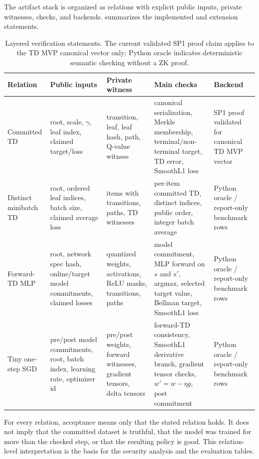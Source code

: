 The artifact stack is organized as relations with explicit public inputs,
private witnesses, checks, and backends.  summarizes the
implemented and extension statements.

\begin{table}[!t]
\centering
\small
\caption{Layered verification statements. The current validated SP1 proof
claim applies to the TD MVP canonical vector only; Python oracle indicates
deterministic semantic checking without a ZK proof.}
\label{tab:relations}
\begin{tabular}{p{2.7cm} p{3.4cm} p{3.5cm} p{4.5cm} p{1.7cm}}
\toprule
Relation & Public inputs & Private witness & Main checks & Backend \\
\midrule
Committed TD &
root, scale, $\gamma$, leaf index, claimed target/loss &
transition, leaf, leaf hash, path, Q-value witness &
canonical serialization, Merkle membership, terminal/non-terminal target, TD
error, SmoothL1 loss &
SP1 proof validated for canonical TD MVP vector \\
\midrule
Distinct minibatch TD &
root, ordered leaf indices, batch size, claimed average loss &
items with transitions, paths, TD witnesses &
per-item committed TD, distinct indices, public order, integer batch average &
Python oracle / report-only benchmark rows \\
\midrule
Forward-TD MLP &
root, network spec hash, online/target model commitments, claimed losses &
quantized weights, activations, ReLU masks, transitions, paths &
model commitment, MLP forward on $s$ and $s'$, argmax, selected target value,
Bellman target, SmoothL1 loss &
Python oracle / report-only benchmark rows \\
\midrule
Tiny one-step SGD &
pre/post model commitments, root, batch index, learning rate, optimizer id &
pre/post weights, forward witnesses, gradient tensors, delta tensors &
forward-TD consistency, SmoothL1 derivative branch, gradient tensor checks,
$w' = w - \eta g$, post commitment &
Python oracle / report-only benchmark rows \\
\bottomrule
\end{tabular}
\end{table}

For every relation, acceptance means only that the stated relation holds. It
does not imply that the committed dataset is truthful, that the model was
trained for more than the checked step, or that the resulting policy is good.
This relation-level interpretation is the basis for the security analysis and
the evaluation tables.
